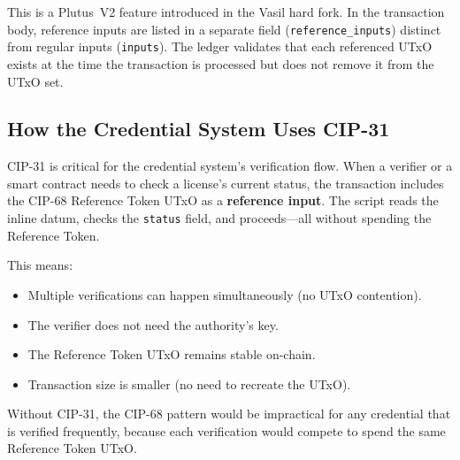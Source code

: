 This is a Plutus~V2 feature introduced in the Vasil hard fork.  In the
transaction body, reference inputs are listed in a separate field
(\texttt{reference\_inputs}) distinct from regular inputs (\texttt{inputs}).
The ledger validates that each referenced UTxO exists at the time the
transaction is processed but does not remove it from the UTxO set.

\subsection{How the Credential System Uses CIP-31}

CIP-31 is critical for the credential system's verification flow.  When a
verifier or a smart contract needs to check a license's current status, the
transaction includes the CIP-68 Reference Token UTxO as a \textbf{reference
input}.  The script reads the inline datum, checks the \texttt{status} field,
and proceeds---all without spending the Reference Token.

This means:
\begin{itemize}[nosep]
  \item Multiple verifications can happen simultaneously (no UTxO contention).
  \item The verifier does not need the authority's key.
  \item The Reference Token UTxO remains stable on-chain.
  \item Transaction size is smaller (no need to recreate the UTxO).
\end{itemize}

Without CIP-31, the CIP-68 pattern would be impractical for any credential
that is verified frequently, because each verification would compete to spend
the same Reference Token UTxO.

